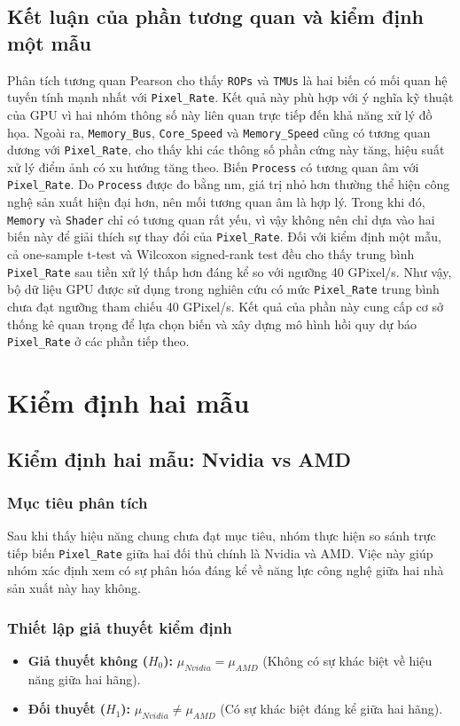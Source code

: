 \subsection{Kết luận của phần tương quan và kiểm định một mẫu}
Phân tích tương quan Pearson cho thấy \texttt{ROPs} và \texttt{TMUs} là hai biến có mối quan hệ tuyến tính mạnh nhất với \texttt{Pixel\_Rate}. Kết quả này phù hợp với ý nghĩa kỹ thuật của GPU vì hai nhóm thông số này liên quan trực tiếp đến khả năng xử lý đồ họa. Ngoài ra, \texttt{Memory\_Bus}, \texttt{Core\_Speed} và \texttt{Memory\_Speed} cũng có tương quan dương với \texttt{Pixel\_Rate}, cho thấy khi các thông số phần cứng này tăng, hiệu suất xử lý điểm ảnh có xu hướng tăng theo.
Biến \texttt{Process} có tương quan âm với \texttt{Pixel\_Rate}. Do \texttt{Process} được đo bằng nm, giá trị nhỏ hơn thường thể hiện công nghệ sản xuất hiện đại hơn, nên mối tương quan âm là hợp lý. Trong khi đó, \texttt{Memory} và \texttt{Shader} chỉ có tương quan rất yếu, vì vậy không nên chỉ dựa vào hai biến này để giải thích sự thay đổi của \texttt{Pixel\_Rate}.
Đối với kiểm định một mẫu, cả one-sample t-test và Wilcoxon signed-rank test đều cho thấy trung bình \texttt{Pixel\_Rate} sau tiền xử lý thấp hơn đáng kể so với ngưỡng 40 GPixel/s. Như vậy, bộ dữ liệu GPU được sử dụng trong nghiên cứu có mức \texttt{Pixel\_Rate} trung bình chưa đạt ngưỡng tham chiếu 40 GPixel/s. Kết quả của phần này cung cấp cơ sở thống kê quan trọng để lựa chọn biến và xây dựng mô hình hồi quy dự báo \texttt{Pixel\_Rate} ở các phần tiếp theo.

\section{Kiểm định hai mẫu}
\subsection{Kiểm định hai mẫu: Nvidia vs AMD}

\subsubsection{Mục tiêu phân tích}
Sau khi thấy hiệu năng chung chưa đạt mục tiêu, nhóm thực hiện so sánh trực tiếp biến \texttt{Pixel\_Rate} giữa hai đối thủ chính là Nvidia và AMD. Việc này giúp nhóm xác định xem có sự phân hóa đáng kể về năng lực công nghệ giữa hai nhà sản xuất này hay không.

\subsubsection{Thiết lập giả thuyết kiểm định}
\begin{itemize}
    \item \textbf{Giả thuyết không ($H_0$):} $\mu_{Nvidia} = \mu_{AMD}$ (Không có sự khác biệt về hiệu năng giữa hai hãng).
    \item \textbf{Đối thuyết ($H_1$):} $\mu_{Nvidia} \neq \mu_{AMD}$ (Có sự khác biệt đáng kể giữa hai hãng).
\end{itemize}

